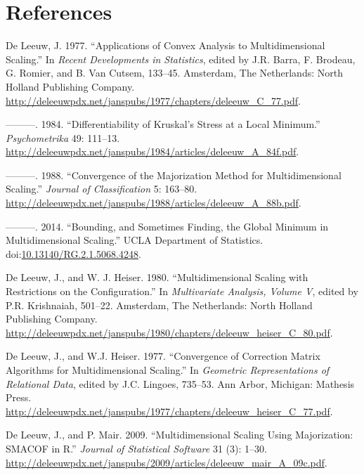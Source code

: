 \documentclass[12pt,]{article}
\begin{document}
\section*{References}\label{references}

\hypertarget{refs}{}
\hypertarget{ref-deleeuw_C_77}{}
De Leeuw, J. 1977. ``Applications of Convex Analysis to Multidimensional
Scaling.'' In \emph{Recent Developments in Statistics}, edited by J.R.
Barra, F. Brodeau, G. Romier, and B. Van Cutsem, 133--45. Amsterdam, The
Netherlands: North Holland Publishing Company.
\url{http://deleeuwpdx.net/janspubs/1977/chapters/deleeuw_C_77.pdf}.

\hypertarget{ref-deleeuw_A_84f}{}
---------. 1984. ``Differentiability of Kruskal's Stress at a Local
Minimum.'' \emph{Psychometrika} 49: 111--13.
\url{http://deleeuwpdx.net/janspubs/1984/articles/deleeuw_A_84f.pdf}.

\hypertarget{ref-deleeuw_A_88b}{}
---------. 1988. ``Convergence of the Majorization Method for
Multidimensional Scaling.'' \emph{Journal of Classification} 5: 163--80.
\url{http://deleeuwpdx.net/janspubs/1988/articles/deleeuw_A_88b.pdf}.

\hypertarget{ref-deleeuw_U_14b}{}
---------. 2014. ``Bounding, and Sometimes Finding, the Global Minimum
in Multidimensional Scaling.'' UCLA Department of Statistics.
doi:\href{https://doi.org/10.13140/RG.2.1.5068.4248}{10.13140/RG.2.1.5068.4248}.

\hypertarget{ref-deleeuw_heiser_C_80}{}
De Leeuw, J., and W. J. Heiser. 1980. ``Multidimensional Scaling with
Restrictions on the Configuration.'' In \emph{Multivariate Analysis,
Volume V}, edited by P.R. Krishnaiah, 501--22. Amsterdam, The
Netherlands: North Holland Publishing Company.
\url{http://deleeuwpdx.net/janspubs/1980/chapters/deleeuw_heiser_C_80.pdf}.

\hypertarget{ref-deleeuw_heiser_C_77}{}
De Leeuw, J., and W.J. Heiser. 1977. ``Convergence of Correction Matrix
Algorithms for Multidimensional Scaling.'' In \emph{Geometric
Representations of Relational Data}, edited by J.C. Lingoes, 735--53.
Ann Arbor, Michigan: Mathesis Press.
\url{http://deleeuwpdx.net/janspubs/1977/chapters/deleeuw_heiser_C_77.pdf}.

\hypertarget{ref-deleeuw_mair_A_09c}{}
De Leeuw, J., and P. Mair. 2009. ``Multidimensional Scaling Using
Majorization: SMACOF in R.'' \emph{Journal of Statistical Software} 31
(3): 1--30.
\url{http://deleeuwpdx.net/janspubs/2009/articles/deleeuw_mair_A_09c.pdf}.
\end{document}
